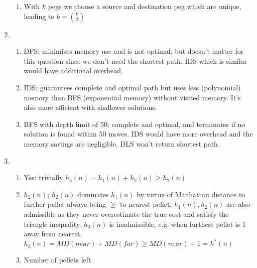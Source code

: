 \documentclass[12pt, a4paper]{article}
\begin{document}
\begin{enumerate}[\Alph*.]
\begin{enumerate}[\arabic*.]
      \item With $k$ pegs we choose a source and destination peg which are unique, leading to $b = \binom k2$ 
    \end{enumerate}

  \item 
    \begin{enumerate}[\arabic*.]
      \item DFS; minimises memory use and is not optimal, but doesn't matter for this question since we don't need the shortest path. IDS which is similar would have additional overhead.

      \item IDS; guarantees complete and optimal path but uses less (polynomial) memory than BFS (exponential memory) without visited memory. It's also more efficient with shallower solutions.

      \item BFS with depth limit of 50; complete and optimal, and terminates if no solution is found within 50 moves. IDS would have more overhead and the memory savings are negligible. DLS won't return shortest path.
    \end{enumerate}

  \item 
    \begin{enumerate}[\arabic*.]
      \item Yes; trivially $h_3(n) = h_1(n) + h_2(n) \geq h_2(n)$

      \item $h_{2}(n)$; $h_2(n)$ dominates $h_1(n)$ by virtue of Manhattan distance to further pellet always being $\geq$ to nearest pellet. $h_1(n), h_2(n)$ are also admissible as they never overestimate the true cost and satisfy the triangle inequality. $h_3(n)$ is inadmissible, e.g. when furthest pellet is 1 away from nearest, $h_3(n) = MD(near) + MD(far) \geq MD(near) + 1 = h^*(n)$

      \item Number of pellets left.
    \end{enumerate}
\end{enumerate}
\end{document}
